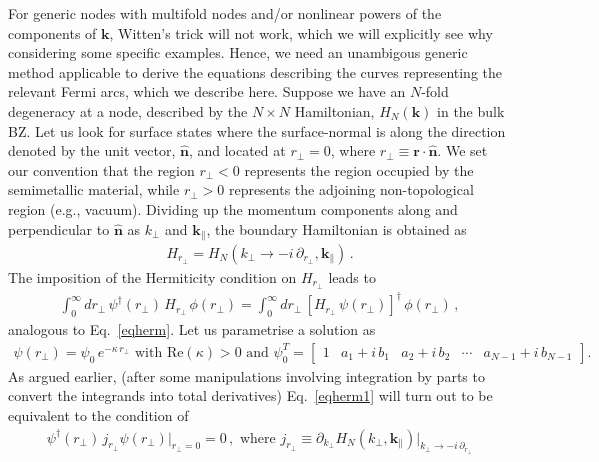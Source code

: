 \documentclass[aps,prb,onecolumn, footinbib, 10pt]{revtex4-2}
\begin{document}
For generic nodes with multifold nodes and/or nonlinear powers of the components of $\boldsymbol k$, Witten's trick will not work, which we will explicitly see why considering some specific examples. Hence, we need an unambigous generic method applicable to derive the equations describing the curves representing the relevant Fermi arcs, which we describe here. Suppose we have an $N$-fold degeneracy at a node, described by the $N \times N $ Hamiltonian, $H_N (\boldsymbol k)$ in the bulk BZ. Let us look for surface states where the surface-normal is along the direction denoted by the unit vector, $\boldsymbol{\hat n}$, and located at $r_\perp = 0$, where $ r_\perp \equiv \boldsymbol r \cdot \boldsymbol{\hat n}$. We set our convention that the region $ r_\perp <0 $ represents the region occupied by the semimetallic material, while $r_\perp >0 $ represents the adjoining non-topological region (e.g., vacuum). Dividing up the momentum components along and perpendicular to $\boldsymbol{\hat n}$ as $  k_\perp$ and $\boldsymbol k_\parallel $, the boundary Hamiltonian is obtained as
\begin{align}
H_{r_\perp} = H_N ( k_\perp\rightarrow -i \, \partial_{r_\perp} , \boldsymbol k_\parallel)\,.
\end{align}
The imposition of the Hermiticity condition on $H_{r_\perp}$ leads to
\begin{align}
\label{eqherm1}
 \int_0^\infty  dr_\perp \,\psi^\dagger (r_\perp) \, H_{r_\perp}\,\phi (r_\perp) = 
 \int_0^\infty  dr_\perp\, [ H_{r_\perp}\, \psi(r_\perp) ]^\dagger\,\phi(r_\perp) \,,
\end{align}
analogous to Eq.~\eqref{eqherm}. Let us parametrise a solution as
\begin{align}
\label{eq11}
\psi (r_\perp) = \psi_0 \, e^{- \kappa \, r_\perp} \text{ with } \text{Re}(\kappa) > 0
\text{ and } 
 \psi_0^T  = \begin{bmatrix}
1 & a_1 +i \, b_1 & a_2 + i \, b_2 & \cdots & a_{N-1} + i \, b_{N-1}
\end{bmatrix}.
\end{align}
As argued earlier, (after some manipulations involving integration by parts to convert the integrands into total derivatives) Eq.~\eqref{eqherm1} will turn out to be equivalent to the condition of
\begin{align}
\label{eqcur}
\psi^\dagger  (r_\perp)\, j_{r_\perp} \psi (r_\perp) \big \vert_{r_\perp=0}= 0\,, \text{ where }
 j_{r_\perp} \equiv \partial_{k_\perp}  H_N(k_\perp,  {\boldsymbol k_\parallel} ) 
\big \vert_{k_\perp \rightarrow -i\, \partial_{r_\perp} }
\end{align}
\end{document}
